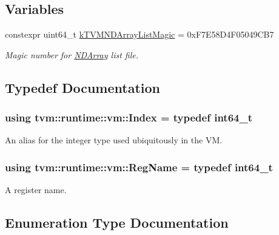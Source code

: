 \subsection*{Variables}
\begin{DoxyCompactItemize}
\item 
constexpr uint64\+\_\+t \hyperlink{namespacetvm_1_1runtime_1_1vm_a29161815faff1b5a221c0dae1c87bb4e}{k\+T\+V\+M\+N\+D\+Array\+List\+Magic} = 0x\+F7\+E58\+D4\+F05049\+C\+B7
\begin{DoxyCompactList}\small\item\em Magic number for \hyperlink{classtvm_1_1runtime_1_1NDArray}{N\+D\+Array} list file. \end{DoxyCompactList}\end{DoxyCompactItemize}


\subsection{Typedef Documentation}
\subsubsection[{\texorpdfstring{Index}{Index}}]{\setlength{\rightskip}{0pt plus 5cm}using {\bf tvm\+::runtime\+::vm\+::\+Index} = typedef int64\+\_\+t}\hypertarget{namespacetvm_1_1runtime_1_1vm_a3597867d2db714bf760876a23d6b7d3d}{}\label{namespacetvm_1_1runtime_1_1vm_a3597867d2db714bf760876a23d6b7d3d}


An alias for the integer type used ubiquitously in the VM. 

\subsubsection[{\texorpdfstring{Reg\+Name}{RegName}}]{\setlength{\rightskip}{0pt plus 5cm}using {\bf tvm\+::runtime\+::vm\+::\+Reg\+Name} = typedef int64\+\_\+t}\hypertarget{namespacetvm_1_1runtime_1_1vm_a3bbbf700719e9dc3dda2bc25210c18ae}{}\label{namespacetvm_1_1runtime_1_1vm_a3bbbf700719e9dc3dda2bc25210c18ae}


A register name. 



\subsection{Enumeration Type Documentation}
